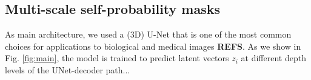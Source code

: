 \subsection{Multi-scale self-probability masks}\label{sec:multiscale_patches}
As main architecture, we used a (3D) U-Net \cite{ronneberger2015u, cciccek20163d} that is one of the most common choices for applications to biological and medical images \textbf{REFS}.
As we show in Fig. \ref{fig:main}, the model is trained to predict latent vectors $z_i$ at different depth levels of the UNet-decoder path...


